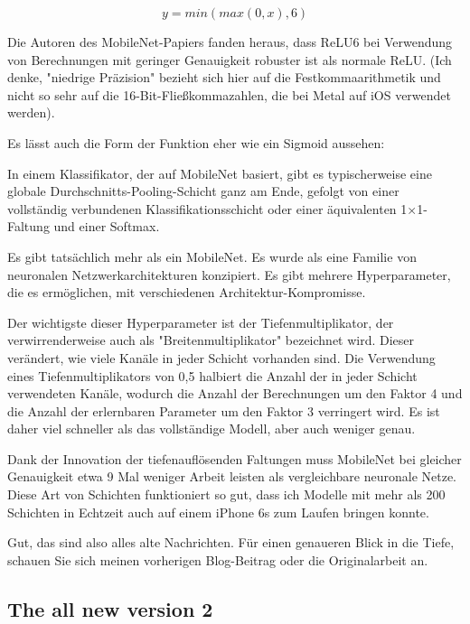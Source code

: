 $$y = min(max(0, x), 6)$$

Die Autoren des MobileNet-Papiers fanden heraus, dass ReLU6 bei Verwendung von Berechnungen mit geringer Genauigkeit robuster ist als normale ReLU. (Ich denke, "niedrige Präzision" bezieht sich hier auf die Festkommaarithmetik und nicht so sehr auf die 16-Bit-Fließkommazahlen, die bei Metal auf iOS verwendet werden).


Es lässt auch die Form der Funktion eher wie ein Sigmoid aussehen:



In einem Klassifikator, der auf MobileNet basiert, gibt es typischerweise eine globale Durchschnitts-Pooling-Schicht ganz am Ende, gefolgt von einer vollständig verbundenen Klassifikationsschicht oder einer äquivalenten 1×1-Faltung und einer Softmax.

Es gibt tatsächlich mehr als ein MobileNet. Es wurde als eine Familie von neuronalen Netzwerkarchitekturen konzipiert. Es gibt mehrere Hyperparameter, die es ermöglichen, mit verschiedenen Architektur-Kompromisse.
 
Der wichtigste dieser Hyperparameter ist der Tiefenmultiplikator, der verwirrenderweise auch als "Breitenmultiplikator" bezeichnet wird. Dieser verändert, wie viele Kanäle in jeder Schicht vorhanden sind. Die Verwendung eines Tiefenmultiplikators von 0,5 halbiert die Anzahl der in jeder Schicht verwendeten Kanäle, wodurch die Anzahl der Berechnungen um den Faktor 4 und die Anzahl der erlernbaren Parameter um den Faktor 3 verringert wird. Es ist daher viel schneller als das vollständige Modell, aber auch weniger genau.

Dank der Innovation der tiefenauflösenden Faltungen muss MobileNet bei gleicher Genauigkeit etwa 9 Mal weniger Arbeit leisten als vergleichbare neuronale Netze. Diese Art von Schichten funktioniert so gut, dass ich Modelle mit mehr als 200 Schichten in Echtzeit auch auf einem iPhone 6s zum Laufen bringen konnte.

Gut, das sind also alles alte Nachrichten. Für einen genaueren Blick in die Tiefe, schauen Sie sich meinen vorherigen Blog-Beitrag oder die Originalarbeit an.






\subsection{The all new version 2}

